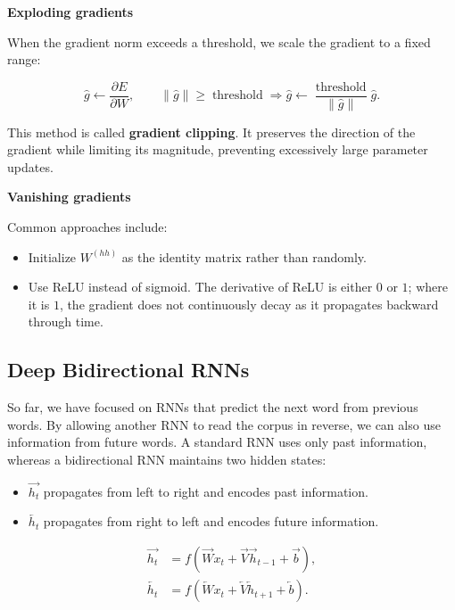 \documentclass[
  a4paper,
  10pt]{article}
\providecommand{\tightlist}{%
  \setlength{\itemsep}{0pt}\setlength{\parskip}{0pt}}
\begin{document}
\textbf{Exploding gradients}

When the gradient norm exceeds a threshold, we scale the gradient to a
fixed range:

\[
\hat{g}\leftarrow\frac{\partial E}{\partial W},
\qquad
\left\lVert\hat{g}\right\rVert\ge\operatorname{threshold}
\Rightarrow
\hat{g}\leftarrow
\frac{\operatorname{threshold}}{\left\lVert\hat{g}\right\rVert}\hat{g}.
\]

This method is called \textbf{gradient clipping}. It preserves the
direction of the gradient while limiting its magnitude, preventing
excessively large parameter updates.

\textbf{Vanishing gradients}

Common approaches include:

\begin{itemize}
\tightlist
\item
  Initialize \(W^{(hh)}\) as the identity matrix rather than randomly.
\item
  Use ReLU instead of sigmoid. The derivative of ReLU is either \(0\) or
  \(1\); where it is \(1\), the gradient does not continuously decay as
  it propagates backward through time.
\end{itemize}

\subsection{Deep Bidirectional RNNs}\label{deep-bidirectional-rnns}

So far, we have focused on RNNs that predict the next word from previous
words. By allowing another RNN to read the corpus in reverse, we can
also use information from future words. A standard RNN uses only past
information, whereas a bidirectional RNN maintains two hidden states:

\begin{itemize}
\tightlist
\item
  \(\overrightarrow{h_t}\) propagates from left to right and encodes
  past information.
\item
  \(\overleftarrow{h_t}\) propagates from right to left and encodes
  future information.
\end{itemize}

\[
\begin{aligned}
\overrightarrow{h_t}
&=f\left(
\overrightarrow{W}x_t
+\overrightarrow{V}\overrightarrow{h}_{t-1}
+\overrightarrow{b}
\right),\\
\overleftarrow{h_t}
&=f\left(
\overleftarrow{W}x_t
+\overleftarrow{V}\overleftarrow{h}_{t+1}
+\overleftarrow{b}
\right).
\end{aligned}
\]
\end{document}
